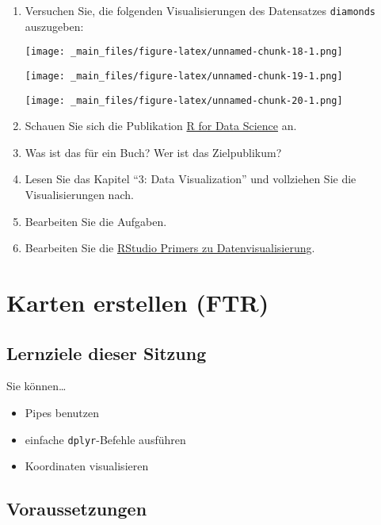 \documentclass[
  ngerman,
]{article}
\providecommand{\tightlist}{%
  \setlength{\itemsep}{0pt}\setlength{\parskip}{0pt}}
\begin{document}
\begin{enumerate}
\def\labelenumi{\arabic{enumi}.}
\item
  Versuchen Sie, die folgenden Visualisierungen des Datensatzes \texttt{diamonds} auszugeben:

  \texttt{[image: \_main\_files/figure-latex/unnamed-chunk-18-1.png]}

  \texttt{[image: \_main\_files/figure-latex/unnamed-chunk-19-1.png]}

  \texttt{[image: \_main\_files/figure-latex/unnamed-chunk-20-1.png]}
\item
  Schauen Sie sich die Publikation \href{https://r4ds.had.co.nz/}{R for Data Science} an.
\item
  Was ist das für ein Buch? Wer ist das Zielpublikum?
\item
  Lesen Sie das Kapitel ``3: Data Visualization'' und vollziehen Sie die Visualisierungen nach.
\item
  Bearbeiten Sie die Aufgaben.
\item
  Bearbeiten Sie die \href{https://rstudio.cloud/learn/primers/3}{RStudio Primers zu Datenvisualisierung}.
\end{enumerate}

\hypertarget{karten-erstellen-ftr}{%
\section{Karten erstellen (FTR)}\label{karten-erstellen-ftr}}

\hypertarget{lernziele-dieser-sitzung-1}{%
\subsection{Lernziele dieser Sitzung}\label{lernziele-dieser-sitzung-1}}

Sie können\ldots{}

\begin{itemize}
\tightlist
\item
  Pipes benutzen
\item
  einfache \texttt{dplyr}-Befehle ausführen
\item
  Koordinaten visualisieren
\end{itemize}

\hypertarget{voraussetzungen-1}{%
\subsection{Voraussetzungen}\label{voraussetzungen-1}}
\end{document}
